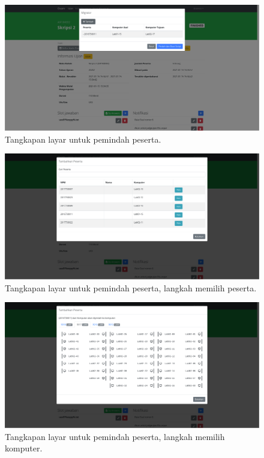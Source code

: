     \begin{figure}
        \centering
        \includegraphics[width=0.7\paperwidth]{Gambar/implemented-interface/admin/migrator-home.png}
        \caption{Tangkapan layar untuk pemindah peserta.}
        \label{fig:screenshot-admin-migrator-home}
    \end{figure}
    \begin{figure}
        \centering
        \includegraphics[width=0.7\paperwidth]{Gambar/implemented-interface/admin/migrator-picker-peserta.png}
        \caption{Tangkapan layar untuk pemindah peserta, langkah memilih peserta.}
        \label{fig:screenshot-admin-migrator-picker-peserta}
    \end{figure}
    \begin{figure}
        \centering
        \includegraphics[width=0.7\paperwidth]{Gambar/implemented-interface/admin/migrator-picker-komputer.png}
        \caption{Tangkapan layar untuk pemindah peserta, langkah memilih komputer.}
        \label{fig:screenshot-admin-picker-komputer}
    \end{figure}
